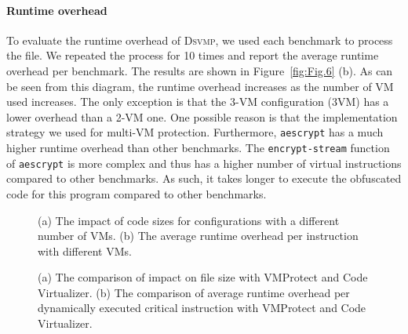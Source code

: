 \documentclass[conference]{IEEEtran}
\newcommand{\DSVMP}{\textsc{Dsvmp}\xspace}
\begin{document}
\paragraph*{Runtime overhead} To evaluate the runtime overhead of \DSVMP, we used each benchmark to process the file. We repeated the process for 10 times and report the average runtime overhead per benchmark. The results are shown in Figure~\ref{fig:Fig.6} (b).
As can be seen from this diagram, the runtime overhead increases as the number of VM used increases. The only exception is that the 3-VM configuration (3VM) has a lower overhead than a 2-VM one. One possible reason is that the implementation strategy we used for multi-VM protection. 
Furthermore, \texttt{aescrypt} has a much higher runtime overhead than other benchmarks. The \texttt{encrypt-stream} function of  \texttt{aescrypt} is  more complex and thus has a higher number of virtual instructions compared to other benchmarks. As such, it takes longer to execute the obfuscated code for this program compared to other benchmarks.

\begin{figure}[t]
\centering
{}
\caption{(a) The impact of code sizes for configurations with a different number of VMs. (b) The average runtime overhead per instruction with different VMs.}\label{fig:Fig.6}
\centering
{}
\caption{(a) The comparison of impact on file size with VMProtect and Code Virtualizer. (b) The comparison of average runtime overhead per dynamically executed critical instruction with VMProtect and Code Virtualizer.}\label{fig:Fig.7}
\vspace{-4mm}
\end{figure}
\end{document}
